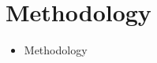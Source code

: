 \section{Methodology}
\frame{\tableofcontents[currentsection]}

\begin{frame}
    \begin{itemize}
        \item Methodology
    \end{itemize}
\end{frame}